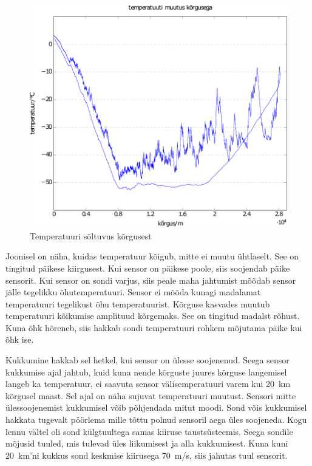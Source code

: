 \documentclass{trkut}%
\begin{document}
\begin{figure}[h]
	\includegraphics[width=1\textwidth]{PicGra/tempkõr.pdf}
	\caption{Temperatuuri sõltuvus kõrgusest}
	\label{TempKõrgus}%
\end{figure}

Joonisel on näha, kuidas temperatuur kõigub, mitte ei muutu ühtlaselt. See on tingitud päikese kiirgusest. Kui sensor on päikese poole, siis soojendab päike sensorit. Kui sensor on sondi varjus, siis peale maha jahtumist mõõdab sensor jälle tegelikku õhutemperatuuri. Sensor ei mõõda kunagi madalamat temperatuuri tegelikust õhu temperatuurist. Kõrguse kasvades muutub temperatuuri kõikumise amplituud kõrgemaks. See on tingitud madalst rõhust. Kuna õhk hõreneb, siis hakkab sondi temperatuuri rohkem mõjutama päike kui õhk ise.

Kukkumine hakkab sel hetkel, kui sensor on ülesse soojenenud. Seega sensor kukkumise ajal jahtub, kuid kuna nende kõrguste juures kõrguse langemisel langeb ka temperatuur, ei saavuta sensor välisemperatuuri varem kui \SI{20}{km} kõrgusel maast. Sel ajal on näha sujuvat temperatuuri muutust. Sensori mitte ülessoojenemist kukkumisel võib põhjendada mitut moodi. Sond võis kukkumisel hakkata tugevalt pöörlema mille tõttu polnud sensoril aega üles soojeneda. Kogu lennu vältel oli sond külgtuultega samas kiiruse taustsüsteemis. Seega sondile mõjusid tuuled, mis tulevad üles liikumisest ja alla kukkumisest. Kuna kuni \SI{20}{km}'ni kukkus sond keskmise kiirusega \SI{70}{m/s}, siis jahutas tuul sensorit.
\end{document}
